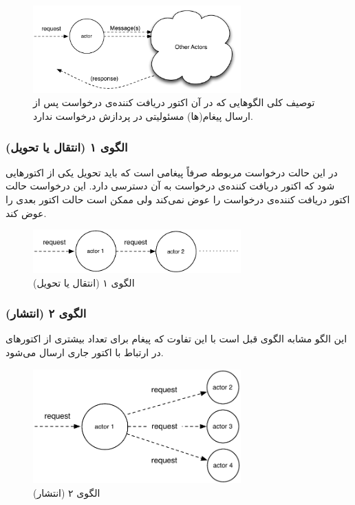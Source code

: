 \begin{figure}[hb]
    \begin{center}
	\includegraphics[width=8cm]{4-ProposedFramework/Figures/Patterns_stateless.pdf}
    \end{center}
    \caption{\label{fig:Patterns_stateless}توصیف کلی الگوهایی که در آن اکتور دریافت کننده‌ی درخواست پس از ارسال پیغام(ها) مسئولیتی در پردازش درخواست ندارد.}
\end{figure}

\subsubsection{الگوی ۱ (انتقال یا تحویل)}
در این حالت درخواست مربوطه صرفاً پیغامی‌ است که باید تحویل یکی از اکتورهایی شود که اکتور دریافت کننده‌ی درخواست به آن دسترسی دارد. این درخواست حالت اکتور دریافت کننده‌ی درخواست را عوض نمی‌کند ولی ممکن است حالت اکتور بعدی را عوض کند. 

\begin{figure}[hb]
    \begin{center}
	\includegraphics[width=8cm]{4-ProposedFramework/Figures/Patterns_stateless_forward.pdf}
    \end{center}
    \caption{\label{fig:Patterns_stateless_forward}الگوی ۱ (انتقال یا تحویل)}
\end{figure}


\subsubsection{الگوی ۲ (انتشار)}
این الگو مشابه الگوی قبل است با این تفاوت که پیغام برای تعداد بیشتری از اکتورهای در ارتباط با اکتور جاری ارسال می‌شود.
\begin{figure}[hb]
    \begin{center}
	\includegraphics[width=8cm]{4-ProposedFramework/Figures/Patterns_stateless_broadcast.pdf}
    \end{center}
    \caption{\label{fig:Patterns_stateless_broadcast}الگوی ۲ (انتشار)}
\end{figure}





